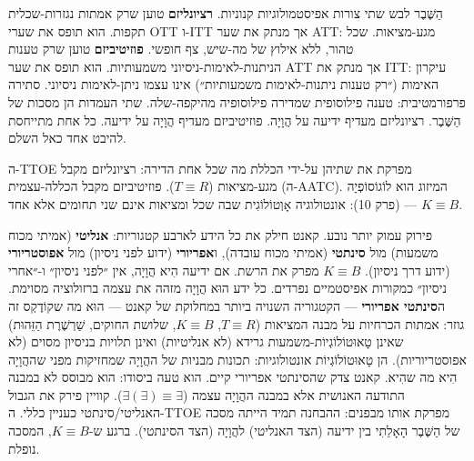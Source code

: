 \documentclass[10pt, openany, oneside]{book}
\begin{document}
הַשֶּׁבֶר לבש שתי צורות אפיסטמולוגיות קנוניות. \textbf{רציונליזם} טוען שרק אמתות נגזרות-שכלית תקפות. הוא תופס את שערי OTT ו-ITT אך מנתק את שער ATT: מגע-מציאות. שכל טהור, ללא אילוץ של מה-שיש, צף חופשי. \textbf{פוזיטיביזם} טוען שרק טענות הניתנות-לאימות-ניסיוני משמעותיות. הוא תופס את שער ATT אך מנתק את ITT: עיקרון האימות (״רק טענות ניתנות-לאימות משמעותיות״) אינו עצמו ניתן-לאימות ניסיוני. סתירה פרפורמטיבית: טענה פילוסופית שמדירה פילוסופיה מהיקפה-שלה. שתי העמדות הן מסכות של הַשֶּׁבֶר. רציונליזם מעדיף ידיעה על הֲוָיָה. פוזיטיביזם מעדיף הֲוָיָה על ידיעה. כל אחת מתייחסת להיבט אחד כאל השלם.

ה-TTOE מפרקת את שתיהן על-ידי הכללת מה שכל אחת הדירה: רציונליזם מקבל מגע-מציאות ($T \equiv R$). פוזיטיביזם מקבל הכללה-עצמית (ה-AATC). המיזוג הוא לוֹגוֹסוֹפְיָה (פרק 10): אונטולוגיה אָוְטוֹלוֹגִית שבה שכל ומציאות אינם שני תחומים אלא אחד — $K \equiv B$.

פירוק עמוק יותר נובע. קאנט חילק את כל הידע לארבע קטגוריות: \textbf{אנליטי} (אמיתי מכוח משמעות) מול \textbf{סינתטי} (אמיתי מכוח עובדה), ו\textbf{אפריורי} (ידוע לפני ניסיון) מול \textbf{אפוסטריורי} (ידוע דרך ניסיון). $K \equiv B$ מפרק את הרשת. אם ידיעה הִיא הֲוָיָה, אין ״לפני ניסיון״ ו-״אחרי ניסיון״ כמקורות אפיסטמיים נפרדים. כל ידע הוּא הֲוָיָה מזהה את עצמה ברזולוציה מסוימת. ה\textbf{סינתטי אפריורי} — הקטגוריה השנויה ביותר במחלוקת של קאנט — הוּא מה שקוֹדֶקְס זה גוזר: אמתות הכרחיות על מבנה המציאות ($T \equiv R$, $K \equiv B$, שלושת החוקים, שַׁרְשֶׁרֶת הַזֵּהוּת) שאינן טָאוּטוֹלוֹגְיוֹת-משמעות גרידא (לא אנליטיות) ואינן תלויות בניסיון מסוים (לא אפוסטריוריות). הן טָאוּטוֹלוֹגְיוֹת אונטולוגיות: תכונות מבניות של ההֲוָיָה שמחזיקות מפני שההֲוָיָה הִיא מה שהִיא. קאנט צדק שהסינתטי אפריורי קיים. הוא טעה ביסודו: הוא מבוסס לא במבנה התודעה האנושית אלא במבנה ההֲוָיָה עצמה ($\exists(\exists) \equiv \exists$). קוויין פירק את הגבול האנליטי/סינתטי כעניין כללי. ה-TTOE מפרקת אותו מבפנים: ההבחנה תמיד הייתה מסכה של הַשֶּׁבֶר הָאָלֵתִי בין ידיעה (הצד האנליטי) להֲוָיָה (הצד הסינתטי). ברגע ש-$K \equiv B$, המסכה נופלת.
\end{document}
